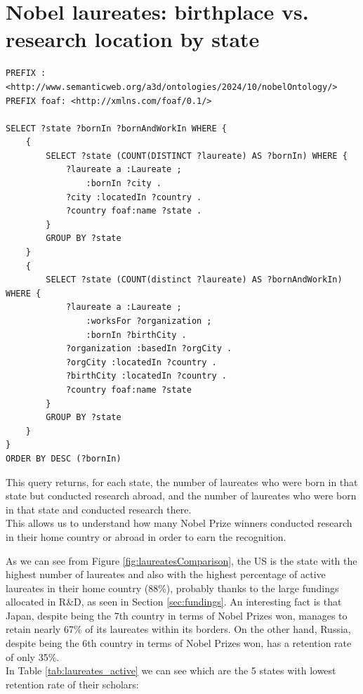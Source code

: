 \documentclass{article}
\begin{document}
\newpage

\section{Nobel laureates: birthplace vs. research location by state}
\begin{lstlisting}
PREFIX : <http://www.semanticweb.org/a3d/ontologies/2024/10/nobelOntology/>
PREFIX foaf: <http://xmlns.com/foaf/0.1/>

SELECT ?state ?bornIn ?bornAndWorkIn WHERE {
    {
        SELECT ?state (COUNT(DISTINCT ?laureate) AS ?bornIn) WHERE {
            ?laureate a :Laureate ;
                :bornIn ?city .
            ?city :locatedIn ?country .
            ?country foaf:name ?state .
        }
        GROUP BY ?state
    }
    {
        SELECT ?state (COUNT(distinct ?laureate) AS ?bornAndWorkIn) WHERE {
            ?laureate a :Laureate ;
                :worksFor ?organization ;
                :bornIn ?birthCity .
            ?organization :basedIn ?orgCity .
            ?orgCity :locatedIn ?country .
            ?birthCity :locatedIn ?country .
            ?country foaf:name ?state
        }
        GROUP BY ?state
    }
}
ORDER BY DESC (?bornIn)
\end{lstlisting}

\vspace{1em}

This query returns, for each state, the number of laureates who were born in that state but conducted research abroad, and the number of
laureates who were born in that state and conducted research there.\\
This allows us to understand how many Nobel Prize winners conducted research in their home country or abroad in order to earn the recognition.

As we can see from Figure \ref{fig:laureatesComparison}, the US is the state with the highest number of laureates and also with the highest percentage
of active laureates in their home country (88\%), probably thanks to the large fundings allocated in R\&D, as seen in Section \ref{sec:fundings}.
An interesting fact is that Japan, despite being the 7th country in terms of Nobel Prizes won, manages to retain nearly 67\% of its laureates
within its borders. On the other hand, Russia, despite being the 6th country in terms of Nobel Prizes won, has a retention rate of only 35\%.\\

In Table \ref{tab:laureates_active} we can see which are the 5 states with lowest retention rate of their scholars:
\end{document}
